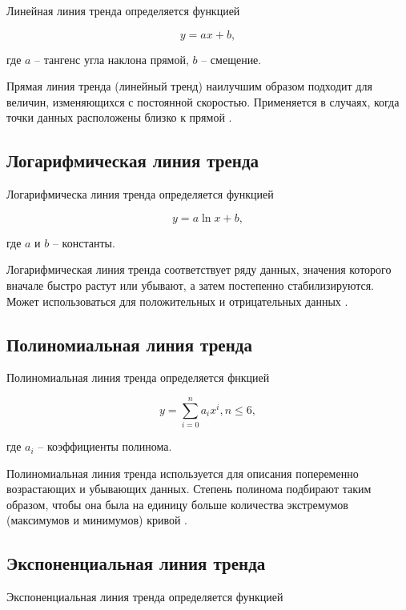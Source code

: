 \documentclass[a4paper,14pt]{extreport}
\begin{document}
Линейная линия тренда определяется функцией

\begin{equation}
	y = ax + b,
\end{equation}

где $a$ -- тангенс угла наклона прямой, $b$ -- смещение.

Прямая линия тренда (линейный тренд) наилучшим образом подходит для величин, изменяющихся с постоянной скоростью. Приме­няется в случаях, когда точки данных расположены близко к прямой \cite{lt_exel}.

\subsection{Логарифмическая линия тренда}

Логарифмическа линия тренда определяется функцией

\begin{equation}
	y = a\ln x + b,
\end{equation}

где $a$ и $b$ -- константы.

Логарифмическая линия тренда соответствует ряду данных, значения которого вначале быстро растут или убывают, а затем постепенно стабилизируются. Может использоваться для положительных и отрицательных данных \cite{lt_exel}.

\subsection{Полиномиальная линия тренда}

Полиномиальная линия тренда определяется фнкцией

\begin{equation}
	y = \sum_{i = 0}^{n} a_i x^i, n \leqslant 6,
\end{equation}

где $a_i$ -- коэффициенты полинома.

Полиномиальная линия тренда используется для описания попеременно возрастающих и убывающих данных. Степень полинома подбирают таким образом, чтобы она была на единицу больше количества экстремумов (максимумов и минимумов) кривой \cite{lt_exel}.

\subsection{Экспоненциальная линия тренда}

Экспоненциальная линия тренда определяется функцией
\end{document}
